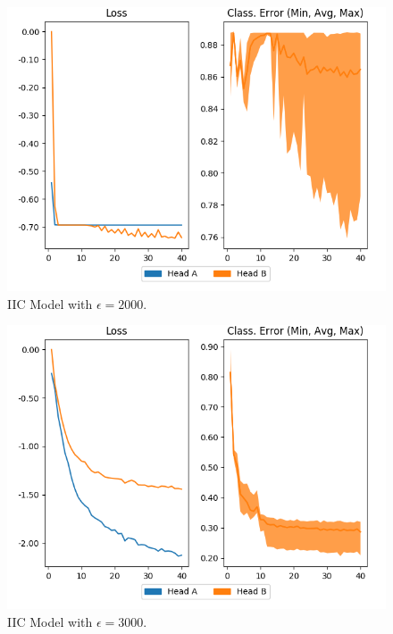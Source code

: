 \documentclass[12pt]{report}
\begin{document}
\begin{figure}[H]
\begin{minipage}{0.45\textwidth}
    \includegraphics[width=\textwidth]{figures/epsilon-2000.png}
    \centering
    IIC Model with $\epsilon=2000$.
  \end{minipage}%
  \hspace{0.09\textwidth}
  \begin{minipage}{0.45\textwidth}
    \includegraphics[width=\textwidth]{figures/epsilon-3000.png}
    \centering
    IIC Model with $\epsilon=3000$.
  \end{minipage}%
  \\[2em]
    \begin{minipage}{0.45\textwidth}

\end{minipage}
\end{figure}
\end{document}
